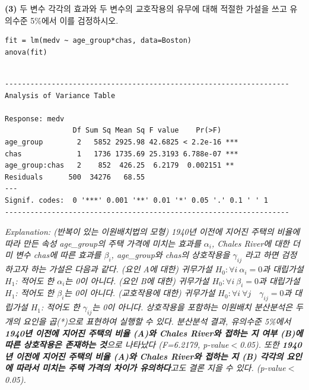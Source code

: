 \documentclass{article}
\begin{document}
\textbf{(3)} 두 변수 각각의 효과와 두 변수의 교호작용의 유무에 대해 적절한 가설을 쓰고 유의수준 5\%에서 이를 검정하시오.
\begin{lstlisting}[style={r-style}]
fit = lm(medv ~ age_group*chas, data=Boston)
anova(fit)
\end{lstlisting}
\begin{lstlisting}[style={out-style}]

-------------------------------------------------------------------    
Analysis of Variance Table

Response: medv
                Df Sum Sq Mean Sq F value    Pr(>F)    
age_group        2   5852 2925.98 42.6825 < 2.2e-16 ***
chas             1   1736 1735.69 25.3193 6.788e-07 ***
age_group:chas   2    852  426.25  6.2179  0.002151 ** 
Residuals      500  34276   68.55 
---
Signif. codes:  0 '***' 0.001 '**' 0.01 '*' 0.05 '.' 0.1 ' ' 1
-------------------------------------------------------------------
\end{lstlisting}
\emph{Explanation: (반복이 있는 이원배치법의 모형) 
1940년 이전에 지어진 주택의 비율에 따라 만든 속성 age\_group의 주택 가격에 미치는 효과를 $\alpha_i$, Chales River에 대한 더미 변수 chas에 따른 효과를 $\beta_i$, age\_group와 chas의 상호작용을 $\gamma_{ij}$ 라고 하면 검정하고자 하는 가설은 다음과 같다.
(요인 A에 대한) 귀무가설 $H_0: \forall i \  \alpha_i=0$과 대립가설 $H_1$: 적어도 한 $\alpha_i$는 0이 아니다. (요인 B에 대한) 귀무가설 $H_0: \forall i \  \beta_i=0$과 대립가설 $H_1$: 적어도 한 $\beta_i$는 0이 아니다. (교호작용에 대한) 귀무가설 $H_0: \forall i \  \forall j \quad \gamma_{ij}=0$과 대립가설 $H_1$: 적어도 한 $\gamma_{ij}$는 0이 아니다. 상호작용을 포함하는 이원배치 분산분석은 두 개의 요인을 곱(*)으로 표현하여 실행할 수 있다. 분산분석 결과, 유의수준 5\%에서 \textbf{1940년 이전에 지어진 주택의 비율 (A)와 Chales River와 접하는 지 여부 (B)에 따른 상호작용은 존재하는 것}으로 나타났다 (F=6.2179, p-value$<$0.05). 
또한 \textbf{1940년 이전에 지어진 주택의 비율 (A)와 Chales River와 접하는 지 (B) 각각의 요인에 따라서 미치는 주택 가격의 차이가 유의하다}고도 결론 지을 수 있다. (p-value$<$0.05).} \\
\end{document}
